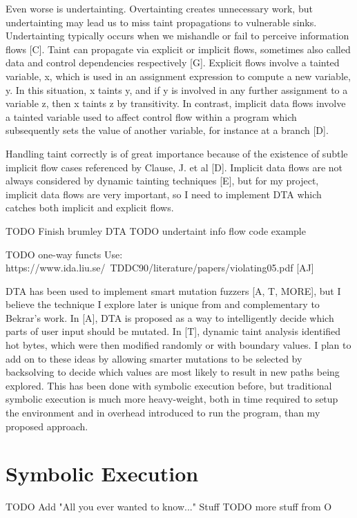 \documentclass[11pt,expanded,copyright]{fsuthesis}
\begin{document}
Even worse is undertainting. Overtainting creates unnecessary work, but undertainting may lead us to miss taint propagations to vulnerable sinks. Undertainting typically occurs when we mishandle or fail to perceive information flows [C]. Taint can propagate via explicit or implicit flows, sometimes also called data and control dependencies respectively [G]. Explicit flows involve a tainted variable, x, which is used in an assignment expression to compute a new variable, y. In this situation, x taints y, and if y is involved in any further assignment to a variable z, then x taints z by transitivity. In contrast, implicit data flows involve a tainted variable used to affect control flow within a program which subsequently sets the value of another variable, for instance at a branch [D]. 

Handling taint correctly is of great importance because of the existence of subtle implicit flow cases referenced by Clause, J. et al [D]. Implicit data flows are not always considered by dynamic tainting techniques [E], but for my project, implicit data flows are very important, so I need to implement DTA which catches both implicit and explicit flows.

TODO Finish brumley DTA
TODO undertaint info flow code example

TODO one-way functs
Use: https://www.ida.liu.se/~TDDC90/literature/papers/violating05.pdf
[AJ]


DTA has been used to implement smart mutation fuzzers [A, T, MORE], but I believe the technique I explore later is unique from and complementary to Bekrar's work. In [A], DTA is proposed as a way to intelligently decide which parts of user input should be mutated. In [T], dynamic taint analysis identified hot bytes, which were then modified randomly or with boundary values. I plan to add on to these ideas by allowing smarter mutations to be selected by backsolving to decide which values are most likely to result in new paths being explored. This has been done with symbolic execution before, but traditional symbolic execution is much more heavy-weight, both in time required to setup the environment and in overhead introduced to run the program, than my proposed approach.

\section{Symbolic Execution}

TODO Add "All you ever wanted to know..." Stuff
TODO more stuff from O
\end{document}
